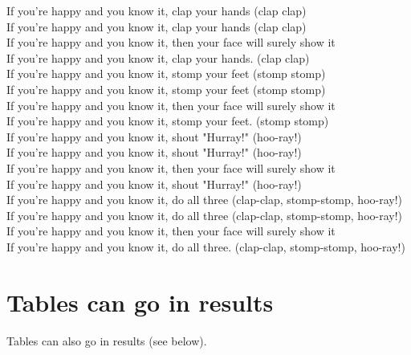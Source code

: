 \begin{center}
If you're happy and you know it, clap your hands (clap clap)\\
If you're happy and you know it, clap your hands (clap clap)\\
If you're happy and you know it, then your face will surely show it\\
If you're happy and you know it, clap your hands. (clap clap)\\

If you're happy and you know it, stomp your feet (stomp stomp)\\
If you're happy and you know it, stomp your feet (stomp stomp)\\
If you're happy and you know it, then your face will surely show it\\
If you're happy and you know it, stomp your feet. (stomp stomp)\\

If you're happy and you know it, shout "Hurray!" (hoo-ray!)\\
If you're happy and you know it, shout "Hurray!" (hoo-ray!)\\
If you're happy and you know it, then your face will surely show it\\
If you're happy and you know it, shout "Hurray!" (hoo-ray!)\\

If you're happy and you know it, do all three (clap-clap, stomp-stomp, hoo-ray!)\\
If you're happy and you know it, do all three (clap-clap, stomp-stomp, hoo-ray!)\\
If you're happy and you know it, then your face will surely show it\\
If you're happy and you know it, do all three. (clap-clap, stomp-stomp, hoo-ray!)\\
    

\end{center}


\section{Tables can go in results}

Tables can also go in results (see below).

